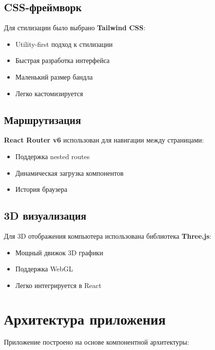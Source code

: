 \documentclass[12pt,a4paper]{report}
\begin{document}
\subsection{CSS-фреймворк}
Для стилизации было выбрано \textbf{Tailwind CSS}:
\begin{itemize}
    \item Utility-first подход к стилизации
    \item Быстрая разработка интерфейса
    \item Маленький размер бандла
    \item Легко кастомизируется
\end{itemize}

\subsection{Маршрутизация}
\textbf{React Router v6} использован для навигации между страницами:
\begin{itemize}
    \item Поддержка nested routes
    \item Динамическая загрузка компонентов
    \item История браузера
\end{itemize}

\subsection{3D визуализация}
Для 3D отображения компьютера использована библиотека \textbf{Three.js}:
\begin{itemize}
    \item Мощный движок 3D графики
    \item Поддержка WebGL
    \item Легко интегрируется в React
\end{itemize}

\section{Архитектура приложения}
Приложение построено на основе компонентной архитектуры:
\end{document}
